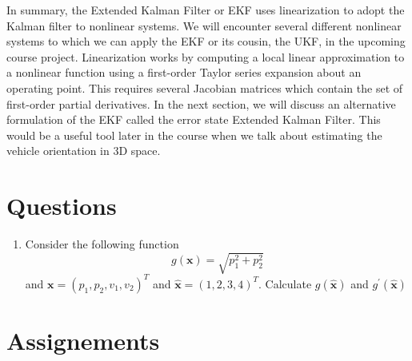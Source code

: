 In summary, the Extended Kalman Filter or EKF uses linearization to adopt
the Kalman filter to nonlinear systems. We will encounter several different nonlinear systems to which we can apply
the EKF or its cousin, the UKF, in the upcoming course project. Linearization works by computing
a local linear approximation to a nonlinear function using a first-order Taylor series expansion
about an operating point. This requires several Jacobian matrices which contain the set of
first-order partial derivatives. In the next section, we will discuss an
alternative formulation of the EKF called the error
state Extended Kalman Filter. This would be a useful tool later
in the course when we talk about estimating the vehicle
orientation in 3D space.

\section{Questions}


\begin{enumerate}
\item Consider the following function 
\begin{equation}
g(\mathbf{x}) = \sqrt{p_{1}^2 + p_{2}^2} 
\end{equation}
and $\mathbf{x} = (p_1, p_2, v_1, v_2)^T$ and $\hat{\mathbf{x}} = (1, 2, 3, 4)^T$. Calculate $g(\hat{\mathbf{x}})$ and $g^{'}(\hat{\mathbf{x}})$
\end{enumerate}

\section{Assignements}
